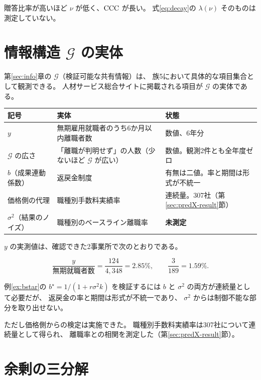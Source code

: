 贈答比率が高いほど $\nu$ が低く、$\mathrm{CCC}$ が長い。
式\eqref{eq:decay}の $\lambda(\nu)$ そのものは測定していない。

\section{情報構造 \texorpdfstring{$\mathcal{G}$}{G} の実体}

第\ref{sec:info}章の $\mathcal{G}$（検証可能な共有情報）は、
族5において具体的な項目集合として観測できる。
人材サービス総合サイトに掲載される項目が $\mathcal{G}$ の実体である。

\begin{center}
\begin{tabularx}{\textwidth}{@{}lXl@{}}
\toprule
記号 & 実体 & 状態 \\
\midrule
$y$ & 無期雇用就職者のうち6か月以内離職者数 & 数値、6年分 \\
$\mathcal{G}$ の広さ & 「離職が判明せず」の人数（少ないほど $\mathcal{G}$ が広い） & 数値。観測2件とも全年度ゼロ \\
$b$（成果連動係数） & 返戻金制度 & 有無は二値。率と期間は形式が不統一 \\
価格側の代理 & 職種別手数料実績率 & 連続量。307社（第\ref{sec:predX-result}節） \\
$\sigma^2$（結果のノイズ） & 職種別のベースライン離職率 & \textbf{未測定} \\
\bottomrule
\end{tabularx}
\label{tab:info-structure-observed}
\end{center}

$y$ の実測値は、確認できた2事業所で次のとおりである。

\[
\frac{y}{\text{無期就職者数}} = \frac{124}{4{,}348} = 2.85\%, \qquad
\frac{3}{189} = 1.59\% .
\]

例\ref{ex:bstar}の $b^\star=1/(1+r\sigma^2 k)$ を検証するには
$b$ と $\sigma^2$ の両方が連続量として必要だが、
返戻金の率と期間は形式が不統一であり、
$\sigma^2$ からは制御不能な部分を取り出せない。

ただし価格側からの検定は実施できた。
職種別手数料実績率は307社について連続量として得られ、
離職率との相関を測定した（第\ref{sec:predX-result}節）。

\section{余剰の三分解}

